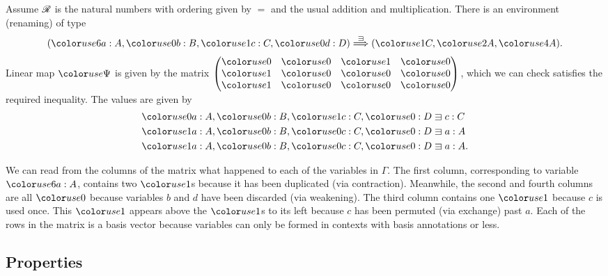 \begin{example}
  Assume $\mathscr R$ is the natural numbers with ordering given by $=$ and the usual
  addition and multiplication.
  There is an environment (renaming) of type
  \[
    \plr{\gr6a : A, \gr0b : B, \gr1c : C, \gr0d : D} \env\sqni
    \plr{\gr1C, \gr2A, \gr4A}.
  \]
  Linear map $\gr\Psi$ is given by the matrix
  \(
    \begin{pmatrix}
      \gr0 & \gr0 & \gr1 & \gr0 \\
      \gr1 & \gr0 & \gr0 & \gr0 \\
      \gr1 & \gr0 & \gr0 & \gr0
    \end{pmatrix}
  \),
  which we can check satisfies the required inequality.
  The values are given by
  \begin{align*}
    \gr0a : A, \gr0b : B, \gr1c : C, \gr0 : D &\sqni c : C \\
    \gr1a : A, \gr0b : B, \gr0c : C, \gr0 : D &\sqni a : A \\
    \gr1a : A, \gr0b : B, \gr0c : C, \gr0 : D &\sqni a : A.
  \end{align*}

  We can read from the columns of the matrix what happened to each of the
  variables in $\Gamma$.
  The first column, corresponding to variable $\gr6a : A$, contains two $\gr1$s
  because it has been duplicated (via contraction).
  Meanwhile, the second and fourth columns are all $\gr0$ because variables
  $b$ and $d$ have been discarded (via weakening).
  The third column contains one $\gr1$ because $c$ is used once.
  This $\gr1$ appears above the $\gr1$s to its left because $c$ has been
  permuted (via exchange) past $a$.
  Each of the rows in the matrix is a basis vector because variables can only
  be formed in contexts with basis annotations or less.
\end{example}

\subsection{Properties}

